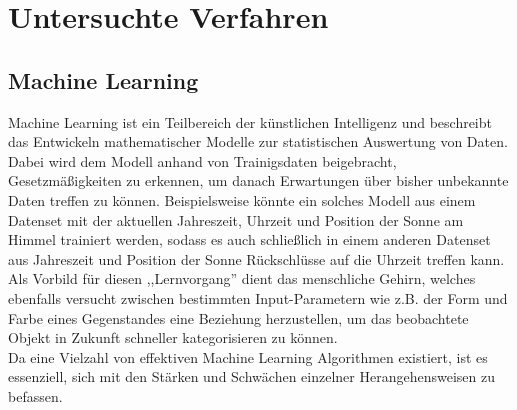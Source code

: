 \chapter{\textbf{Untersuchte Verfahren}}

\section{Machine Learning}\label{unterkapitel}

Machine Learning ist ein Teilbereich der künstlichen Intelligenz und beschreibt das Entwickeln mathematischer 
Modelle zur statistischen Auswertung von Daten.\\
Dabei wird dem Modell anhand von Trainigsdaten beigebracht, Gesetzmäßigkeiten zu erkennen, um danach Erwartungen 
über bisher unbekannte Daten treffen zu können.  
Beispielsweise könnte ein solches Modell aus einem Datenset mit der aktuellen Jahreszeit, Uhrzeit und 
Position der Sonne am Himmel trainiert werden, sodass es auch schließlich in einem anderen Datenset 
aus Jahreszeit und Position der Sonne Rückschlüsse auf die Uhrzeit treffen kann.\\
Als Vorbild für diesen ,,Lernvorgang'' dient das menschliche Gehirn, welches ebenfalls versucht zwischen 
bestimmten Input-Parametern wie z.B. der Form und Farbe eines Gegenstandes eine Beziehung herzustellen,
um das beobachtete Objekt in Zukunft schneller kategorisieren zu können.\\
Da eine Vielzahl von effektiven Machine Learning Algorithmen existiert, ist es essenziell, sich mit den
Stärken und Schwächen einzelner Herangehensweisen zu befassen.\\

